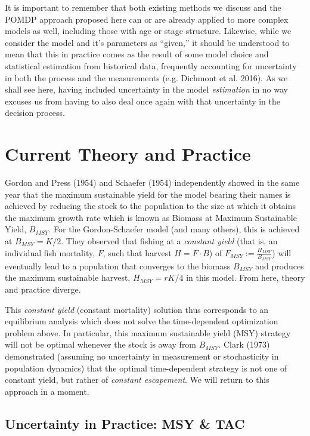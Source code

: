 \documentclass[3p]{elsarticle} %
\begin{document}
It is important to remember that both existing methods we discuss and
the POMDP approach proposed here can or are already applied to more
complex models as well, including those with age or stage structure.
Likewise, while we consider the model and it's parameters as ``given,''
it should be understood to mean that this in practice comes as the
result of some model choice and statistical estimation from historical
data, frequently accounting for uncertainty in both the process and the
measurements (e.g. Dichmont et al. 2016). As we shall see here, having
included uncertainty in the model \emph{estimation} in no way excuses us
from having to also deal once again with that uncertainty in the
decision process.

\section{Current Theory and Practice}\label{current-theory-and-practice}

Gordon and Press (1954) and Schaefer (1954) independently showed in the
same year that the maximum sustainable yield for the model bearing their
names is achieved by reducing the stock to the population to the size at
which it obtains the maximum growth rate which is known as Biomass at
Maximum Sustainable Yield, \(B_{MSY}\). For the Gordon-Schaefer model
(and many others), this is achieved at \(B_{MSY} = K/2\). They observed
that fishing at a \emph{constant yield} (that is, an individual fish
mortality, \(F\), such that harvest \(H = F \cdot B\)) of
\(F_{MSY} := \tfrac{H_{MSY}}{B_{MSY}}\)) will eventually lead to a
population that converges to the biomass \(B_{MSY}\) and produces the
maximum sustainable harvest, \(H_{MSY} = r K / 4\) in this model. From
here, theory and practice diverge.

This \emph{constant yield} (constant mortality) solution thus
corresponds to an equilibrium analysis which does not solve the
time-dependent optimization problem above. In particular, this maximum
sustainable yield (MSY) strategy will not be optimal whenever the stock
is away from \(B_{MSY}\). Clark (1973) demonstrated (assuming no
uncertainty in measurement or stochasticity in population dynamics) that
the optimal time-dependent strategy is not one of constant yield, but
rather of \emph{constant escapement}. We will return to this approach in
a moment.

\subsection{Uncertainty in Practice: MSY \&
TAC}\label{uncertainty-in-practice-msy-tac}
\end{document}
